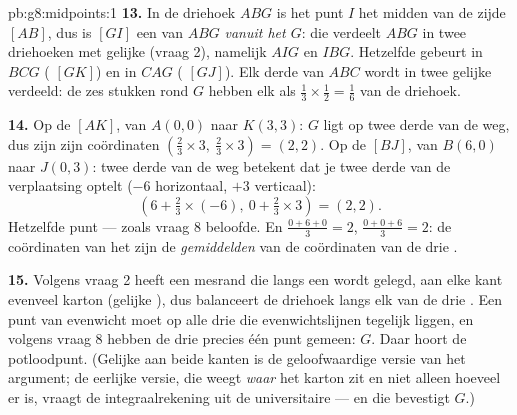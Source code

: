 \begin{solution}{pb:g8:midpoints:1}
\textbf{13.} In de driehoek $ABG$ is het punt $I$ het midden van de zijde $[AB]$,
dus is $[GI]$ een  van $ABG$ \emph{vanuit het  $G$}: die
verdeelt $ABG$ in twee driehoeken met gelijke  (vraag 2), namelijk
$AIG$ en $IBG$. Hetzelfde gebeurt in $BCG$ ( $[GK]$) en in $CAG$
( $[GJ]$). Elk derde van $ABC$ wordt in twee gelijke  verdeeld:
de zes stukken rond $G$ hebben elk als 
$\frac13 \times \frac12 = \frac16$ van de driehoek.

\textbf{14.} Op de  $[AK]$, van $A(0,0)$ naar $K(3,3)$: $G$ ligt op
twee derde van de weg, dus zijn zijn coördinaten
$\left(\frac23 \times 3,\ \frac23 \times 3\right) = (2, 2)$. Op de 
$[BJ]$, van $B(6, 0)$ naar $J(0, 3)$: twee derde van de weg betekent dat je twee
derde van de verplaatsing optelt ($-6$ horizontaal, $+3$ verticaal):
\[
\left(6 + \tfrac23 \times (-6),\ 0 + \tfrac23 \times 3\right)
= (2, 2) .
\]
Hetzelfde punt --- zoals vraag 8 beloofde. En $\frac{0 + 6 + 0}{3} = 2$,
$\frac{0 + 0 + 6}{3} = 2$: de coördinaten van het  zijn de
\emph{gemiddelden} van de coördinaten van de drie .

\textbf{15.} Volgens vraag 2 heeft een mesrand die langs een  wordt
gelegd, aan elke kant evenveel karton (gelijke ), dus balanceert de
driehoek langs elk van de drie . Een punt van evenwicht moet op alle
drie die evenwichtslijnen tegelijk liggen, en volgens vraag 8 hebben de drie
 precies één punt gemeen: $G$. Daar hoort de potloodpunt. (Gelijke
 aan beide kanten is de geloofwaardige versie van het argument; de
eerlijke versie, die weegt \emph{waar} het karton zit en niet alleen hoeveel er
is, vraagt de integraalrekening uit de universitaire  --- en die
bevestigt $G$.)
\end{solution}
